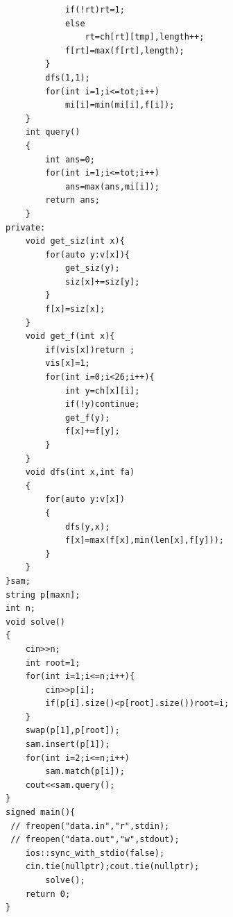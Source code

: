 \documentclass[12pt, a4paper, oneside]{ctexart}
\begin{document}
\begin{lstlisting}
			if(!rt)rt=1;
			else
				rt=ch[rt][tmp],length++;
			f[rt]=max(f[rt],length);
		}
		dfs(1,1);
		for(int i=1;i<=tot;i++)
			mi[i]=min(mi[i],f[i]);
	}
	int query()
	{
		int ans=0;
		for(int i=1;i<=tot;i++)
			ans=max(ans,mi[i]);
		return ans;
	}
private:
	void get_siz(int x){
		for(auto y:v[x]){
			get_siz(y);
			siz[x]+=siz[y];
		}
		f[x]=siz[x];
	}
	void get_f(int x){
		if(vis[x])return ;
		vis[x]=1;
		for(int i=0;i<26;i++){
			int y=ch[x][i];
			if(!y)continue;
			get_f(y);
			f[x]+=f[y];
		}
	}
	void dfs(int x,int fa)
	{
		for(auto y:v[x])
		{
			dfs(y,x);
			f[x]=max(f[x],min(len[x],f[y]));
		}
	}
}sam;
string p[maxn];
int n;
void solve()
{
	cin>>n;
	int root=1;
	for(int i=1;i<=n;i++){
		cin>>p[i];
		if(p[i].size()<p[root].size())root=i;
	}
	swap(p[1],p[root]);
	sam.insert(p[1]);
	for(int i=2;i<=n;i++)
		sam.match(p[i]);
	cout<<sam.query();
}
signed main(){
 // freopen("data.in","r",stdin);
 // freopen("data.out","w",stdout);
	ios::sync_with_stdio(false);
	cin.tie(nullptr);cout.tie(nullptr);
		solve();
	return 0;
}
\end{lstlisting}


\newpage
\end{document}
